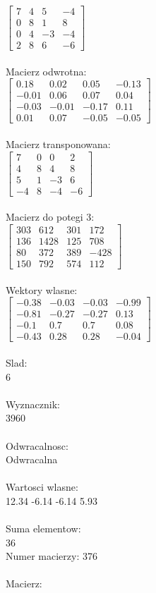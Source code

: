 \documentclass[a4paper,12pt]{article}
\begin{document}
$\begin{bmatrix} 7&4&5&-4\\0&8&1&8\\0&4&-3&-4\\2&8&6&-6 \end{bmatrix}$
\\
\\
Macierz odwrotna:\\

$\begin{bmatrix} 0.18&0.02&0.05&-0.13\\-0.01&0.06&0.07&0.04\\-0.03&-0.01&-0.17&0.11\\0.01&0.07&-0.05&-0.05 \end{bmatrix}$
\\
\\
Macierz transponowana:\\

$\begin{bmatrix} 7&0&0&2\\4&8&4&8\\5&1&-3&6\\-4&8&-4&-6 \end{bmatrix}$
\\
\\
Macierz do potegi 3:\\

$\begin{bmatrix} 303&612&301&172\\136&1428&125&708\\80&372&389&-428\\150&792&574&112 \end{bmatrix}$
\\
\\
Wektory wlasne:\\

$\begin{bmatrix} -0.38&-0.03&-0.03&-0.99\\-0.81&-0.27&-0.27&0.13\\-0.1&0.7&0.7&0.08\\-0.43&0.28&0.28&-0.04 \end{bmatrix}$
\\
\\
Slad:\\
6
\\
\\
Wyznacznik:\\
3960
\\
\\
Odwracalnosc:\\
Odwracalna
\\
\\
Wartosci wlasne:\\
12.34 -6.14 -6.14 5.93
\\
\\
Suma elementow:\\
36
\\
\newpage
Numer macierzy:
376
\\
\\
Macierz:\\
\end{document}
